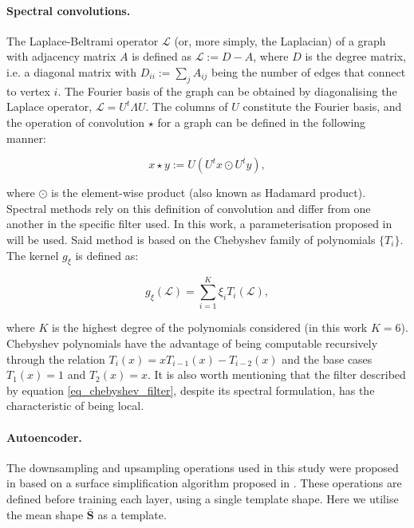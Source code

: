 \paragraph{Spectral convolutions.} The Laplace-Beltrami operator $\mathcal{L}$ (or, more simply, the Laplacian) of a graph with adjacency matrix $A$ is defined as $\mathcal{L}:=D-A$, where $D$ is the degree matrix, i.e. a diagonal matrix with $D_{ii}:=\sum_{j}A_{ij}$ being the number of edges that connect to vertex $i$. The Fourier basis of the graph can be obtained by diagonalising the Laplace operator, $\mathcal{L}=U^t\Lambda U$. The columns of $U$ constitute the Fourier basis, and the operation of convolution $\star$ for a graph can be defined in the following manner:

\begin{equation}
x\star y :=U(U^tx\odot U^ty),
\end{equation}{}

\noindent where $\odot$ is the element-wise product (also known as Hadamard product). Spectral methods rely on this definition of convolution and differ from one another in the specific filter used. In this work, a parameterisation proposed in \cite{ref_spectral_graph_conv} will be used. 
Said method is based on the Chebyshev family of polynomials $\{T_i\}$. The kernel $g_\xi$ is defined as:

\begin{equation}
g_{\xi}(\mathcal{L})=\sum_{i=1}^{K}\xi_i T_i(\mathcal{L}),
\label{eq_chebyshev_filter}
\end{equation}

\noindent where $K$ is the highest degree of the polynomials considered (in this work $K=6$). Chebyshev polynomials have the advantage of being computable recursively through the relation $T_i(x)=xT_{i-1}(x)-T_{i-2}(x)$ and the base cases $T_1(x)=1$ and $T_2(x)=x$. It is also worth mentioning that the filter described by equation \ref{eq_chebyshev_filter}, despite its spectral formulation, has the characteristic of being local.

\paragraph{Autoencoder.} The downsampling and upsampling operations used in this study were proposed in \cite{ref_coma} based on a surface simplification algorithm proposed in \cite{ref_quadric_error}. These operations are defined before training each layer, using a single template shape. Here we utilise the mean shape $\mathbf{\bar{S}}$ as a template.

